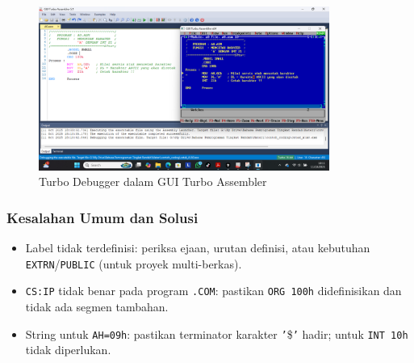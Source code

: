 \documentclass[../main.tex]{subfiles}
\begin{document}
\begin{figure}[H]
    \centering
    \includegraphics[width=0.85\textwidth]{images/gtasm_debugger.png}
    \caption{Turbo Debugger dalam GUI Turbo Assembler}
    \label{fig:gtasm-debugger}
\end{figure}

            \subsubsection{Kesalahan Umum dan Solusi}
\begin{itemize}
    \item Label tidak terdefinisi: periksa ejaan, urutan definisi, atau kebutuhan \texttt{EXTRN}/\texttt{PUBLIC} (untuk proyek multi-berkas).
    \item \texttt{CS:IP} tidak benar pada program \texttt{.COM}: pastikan \texttt{ORG 100h} didefinisikan dan tidak ada segmen tambahan.
    \item String untuk \texttt{AH=09h}: pastikan terminator karakter \texttt{'}\$\texttt{'} hadir; untuk \texttt{INT 10h} tidak diperlukan.
\end{itemize}
\end{document}
